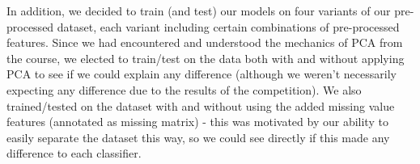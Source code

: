 \documentclass{article}
\def\abovestrut#1{\rule[0in]{0in}{#1}\ignorespaces}
\def\belowstrut#1{\rule[-#1]{0in}{#1}\ignorespaces}
\def\abovespace{\abovestrut{0.20in}}
\def\belowspace{\belowstrut{0.10in}}
\begin{document}



In addition, we decided to train (and test) our models on four variants of our pre-processed dataset, each variant including certain combinations of pre-processed features.
Since we had encountered and understood the mechanics of PCA from the course, we elected to train/test on the data both with and without applying PCA to see if we could explain any difference (although we weren't necessarily expecting any difference due to the results of the competition).
We also trained/tested on the dataset with and without using the added missing value features (annotated as missing matrix) - this was motivated by our ability to easily separate the dataset this way, so we could see directly if this made any difference to each classifier. %
\end{document}
